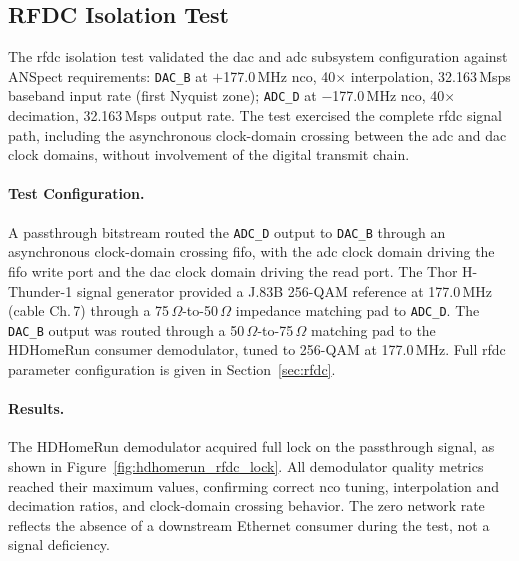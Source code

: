 \subsection{RFDC Isolation Test}
\label{subsec:rfdc_isolation}

The \ac{rfdc} isolation test validated the \ac{dac} and \ac{adc}
subsystem configuration against ANSpect requirements:
\texttt{DAC\_B} at $+$177.0\,MHz \ac{nco}, 40$\times$
interpolation, 32.163\,Msps baseband input rate (first Nyquist
zone); \texttt{ADC\_D} at $-$177.0\,MHz \ac{nco}, 40$\times$
decimation, 32.163\,Msps output rate.
The test exercised the complete \ac{rfdc} signal path, including
the asynchronous clock-domain crossing between the \ac{adc} and
\ac{dac} clock domains, without involvement of the digital
transmit chain.

\FloatBarrier
\paragraph{Test Configuration.}
\leavevmode\par

A passthrough bitstream routed the \texttt{ADC\_D} output to
\texttt{DAC\_B} through an asynchronous clock-domain crossing
\ac{fifo}, with the \ac{adc} clock domain driving the \ac{fifo}
write port and the \ac{dac} clock domain driving the read port.
The Thor H-Thunder-1 signal generator provided a J.83B 256-QAM
reference at 177.0\,MHz (cable Ch.\,7) through a
75\,$\Omega$-to-50\,$\Omega$ impedance matching pad to
\texttt{ADC\_D}.
The \texttt{DAC\_B} output was routed through a
50\,$\Omega$-to-75\,$\Omega$ matching pad to the HDHomeRun
consumer demodulator, tuned to 256-QAM at 177.0\,MHz.
Full \ac{rfdc} parameter configuration is given in
Section~\ref{sec:rfdc}. %

\FloatBarrier
\paragraph{Results.}
\leavevmode\par

The HDHomeRun demodulator acquired full lock on the passthrough
signal, as shown in Figure~\ref{fig:hdhomerun_rfdc_lock}.
All demodulator quality metrics reached their maximum values,
confirming correct \ac{nco} tuning, interpolation and decimation
ratios, and clock-domain crossing behavior.
The zero network rate reflects the absence of a downstream Ethernet
consumer during the test, not a signal deficiency.

